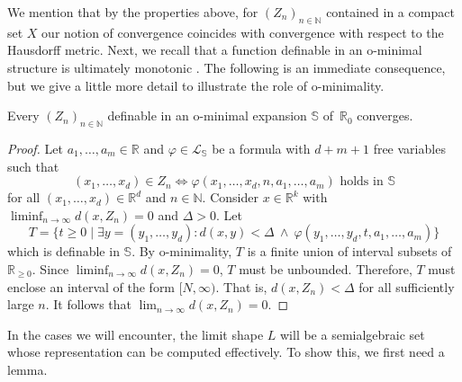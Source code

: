 \documentclass[a4paper,UKenglish,cleveref]{lipics-v2021}
\newcommand{\nat}{\mathbb{N}}
\newcommand{\rel}{\mathbb{R}}
\newcommand{\Lcal}{\mathcal{L}}
\newcommand{\Sb}{\mathbb{S}}
\newcommand{\seq}[1]{(#1)_{n \in \mathbb{N}}}
\begin{document}
We mention that by the properties above, for $\seq{Z_n}$ contained in a compact set $X$ our notion of convergence coincides with convergence with respect to the Hausdorff metric.
Next, we recall that a function definable in an o-minimal structure is ultimately monotonic \cite[Sec.~4.1]{vdD-geometric-categories}. 
The following is an immediate consequence, but we give a little more detail to illustrate the role of o-minimality.

\begin{theorem}
	\label{thm:limshape}
	Every $(Z_n)_{n \in \nat}$ definable in an o-minimal expansion $\Sb$ of~$\rel_0$ converges.
\end{theorem}
\begin{proof}
	Let $a_1,\ldots,a_m \in \rel$ and $\varphi \in \Lcal_{\Sb}$ be a formula with $d + m +1$ free variables such that 
	\[
	(x_1,\ldots,x_d) \in Z_n \Leftrightarrow  \varphi(x_1,\ldots,x_d, n, a_1,\ldots,a_m) \textrm{ holds in } \Sb
	\]
	for all $(x_1,\ldots,x_d)\in\rel^d$ and $n\in\nat$.
	Consider $x \in \rel^k$ with $\liminf_{n \to \infty} d(x, Z_n) = 0$ and $\Delta > 0$.
	Let 
	\[
	T = \{t\ge 0 \mid\exists y = (y_1,\ldots,y_d) \colon d(x, y) < \Delta \:\land\: \varphi(y_1,\ldots,y_d, t, a_1,\ldots,a_m)\}
	\]
	which is definable in $\Sb$.
	By o-minimality, $T$ is a finite union of interval subsets of $\rel_{\ge 0}$.
	Since $\liminf_{n \to \infty} d(x, Z_n) = 0$, $T$ must be unbounded.
	Therefore, $T$ must enclose an interval of the form $[N,\infty)$.
	That is, $d(x, Z_n) < \Delta$ for all sufficiently large $n$.
	It follows that $\lim_{n \to \infty} d(x,Z_n) = 0$.
\end{proof}

In the cases we will encounter, the limit shape $L$ will be a semialgebraic set whose representation can be computed effectively.
To show this, we first need a lemma.
\end{document}
